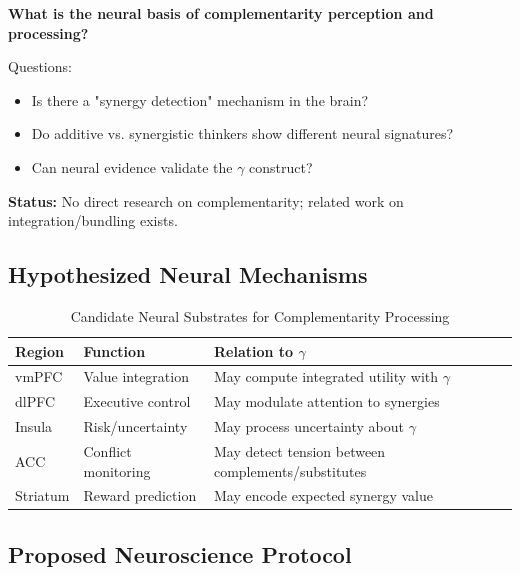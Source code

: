 \begin{tcolorbox}[colback=red!5!white,colframe=red!75!black,title=\textbf{Research Question 5}]
\textbf{What is the neural basis of complementarity perception and processing?}

Questions:
\begin{itemize}[noitemsep]
    \item Is there a "synergy detection" mechanism in the brain?
    \item Do additive vs. synergistic thinkers show different neural signatures?
    \item Can neural evidence validate the $\gamma$ construct?
\end{itemize}

\textbf{Status:} No direct research on complementarity; related work on integration/bundling exists.
\end{tcolorbox}

\subsection{Hypothesized Neural Mechanisms}

\begin{table}[h]
\centering
\caption{Candidate Neural Substrates for Complementarity Processing}
\label{tab:neural-substrates}
\renewcommand{\arraystretch}{1.3}
\begin{tabular}{@{}llp{6cm}@{}}
\toprule
\textbf{Region} & \textbf{Function} & \textbf{Relation to $\gamma$} \\
\midrule
vmPFC & Value integration & May compute integrated utility with $\gamma$ \\
dlPFC & Executive control & May modulate attention to synergies \\
Insula & Risk/uncertainty & May process uncertainty about $\gamma$ \\
ACC & Conflict monitoring & May detect tension between complements/substitutes \\
Striatum & Reward prediction & May encode expected synergy value \\
\bottomrule
\end{tabular}
\end{table}

\subsection{Proposed Neuroscience Protocol}

